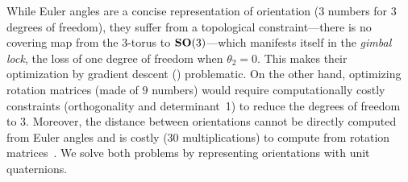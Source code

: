 While Euler angles are a concise representation of orientation ($3$ numbers for $3$ degrees of freedom), they suffer from a topological constraint---there is no covering map from the $3$-torus to $\mathrm{\mathbf{SO}}(3)$---which manifests itself in the \textit{gimbal lock}, the loss of one degree of freedom when $\theta_2=0$. %
This makes their optimization by gradient descent () problematic.
On the other hand, optimizing rotation matrices (made of $9$ numbers) would require computationally costly constraints (orthogonality and determinant~1) to reduce the degrees of freedom to $3$.
Moreover, the distance between orientations cannot be directly computed from Euler angles and is costly (30 multiplications) to compute from rotation matrices~\cite{huynh2009metrics}.
We solve both problems by representing orientations with unit quaternions.

